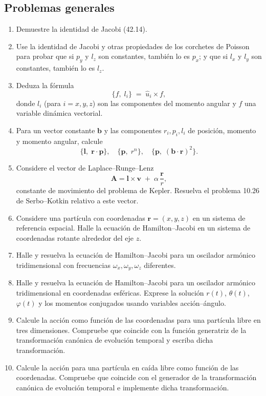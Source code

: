 \documentclass[12pt]{article}
\begin{document}
\subsection*{Problemas generales}
\begin{enumerate}
  \item Demuestre la identidad de Jacobi (42.14).
  \item Use la identidad de Jacobi y otras propiedades de los corchetes de Poisson para probar que si \(p_y\) y \(l_z\) son constantes, también lo es \(p_x\); y que si \(l_x\) y \(l_y\) son constantes, también lo es \(l_z\).
  \item Deduza la fórmula
    \[
      \{f,\;l_i\} \;=\;\hat u_i\times f,
    \]
    donde \(l_i\) (para \(i=x,y,z\)) son las componentes del momento angular y \(f\) una variable dinámica vectorial.
  \item Para un vector constante \(\mathbf b\) y las componentes \(r_i,p_i,l_i\) de posición, momento y momento angular, calcule
    \[
      \{\mathbf l,\;\mathbf r\cdot\mathbf p\},\quad
      \{\mathbf p,\;r^n\},\quad
      \{\mathbf p,\;(\mathbf b\cdot\mathbf r)^2\}.
    \]
  \item Considere el vector de Laplace–Runge–Lenz
    \[
      \mathbf A = \mathbf l\times\mathbf v \;+\;\alpha\,\frac{\mathbf r}{r},
    \]
    constante de movimiento del problema de Kepler. Resuelva el problema 10.26 de Serbo–Kotkin relativo a este vector.
  \item Considere una partícula con coordenadas \(\mathbf r=(x,y,z)\) en un sistema de referencia espacial. Halle la ecuación de Hamilton–Jacobi en un sistema de coordenadas rotante alrededor del eje \(z\).
  \item Halle y resuelva la ecuación de Hamilton–Jacobi para un oscilador armónico tridimensional con frecuencias \(\omega_x,\omega_y,\omega_z\) diferentes.
  \item Halle y resuelva la ecuación de Hamilton–Jacobi para un oscilador armónico tridimensional en coordenadas esféricas. Exprese la solución \(r(t)\), \(\theta(t)\), \(\varphi(t)\) y los momentos conjugados usando variables acción–ángulo.
  \item Calcule la acción como función de las coordenadas para una partícula libre en tres dimensiones. Compruebe que coincide con la función generatriz de la transformación canónica de evolución temporal y escriba dicha transformación.
  \item Calcule la acción para una partícula en caída libre como función de las coordenadas. Compruebe que coincide con el generador de la transformación canónica de evolución temporal e implemente dicha transformación.

\end{enumerate}
\end{document}
